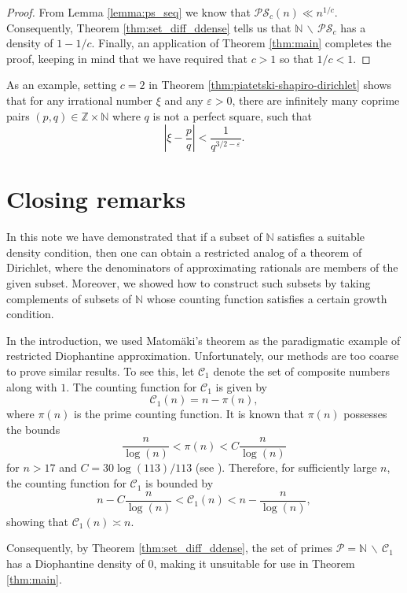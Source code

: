 \documentclass[reqno]{amsart}
\theoremstyle{definition}
\begin{document}
\begin{proof}
    From Lemma \ref{lemma:ps_seq} we know that $\mathcal{PS}_{c}(n) \ll n^{1/c}$.  Consequently, Theorem \ref{thm:set_diff_ddense} tells us that $\mathbb{N}\,\backslash\,\mathcal{PS}_{c}$ has a density of $1 - 1/c$.  Finally, an application of Theorem \ref{thm:main} completes the proof, keeping in mind that we have required that $c > 1$ so that $1/c < 1$.
\end{proof}
As an example, setting $c = 2$ in Theorem \ref{thm:piatetski-shapiro-dirichlet} shows that for any irrational number $\xi$ and any $\varepsilon > 0$, there are infinitely many coprime pairs $(p,q) \in \mathbb{Z} \times \mathbb{N}$ where $q$ is not a perfect square, such that
\begin{equation*}
    \left\vert{\xi- \frac{p}{q}}\right\vert < \frac{1}{q^{3/2-\varepsilon}}.
\end{equation*}

\section{Closing remarks}
In this note we have demonstrated that if a subset of $\mathbb{N}$ satisfies a suitable density condition, then one can obtain a restricted analog of a theorem of Dirichlet, where the denominators of approximating rationals are members of the given subset.  Moreover, we showed how to construct such subsets by taking complements of subsets of $\mathbb{N}$ whose counting function satisfies a certain growth condition.

In the introduction, we used Matom{\"a}ki's theorem as the paradigmatic example of restricted Diophantine approximation.  Unfortunately, our methods are too coarse to prove similar results.  To see this, let $\mathcal{C}_{1}$ denote the set of composite numbers along with $1$.  The counting function for $\mathcal{C}_{1}$ is given by
\begin{equation*}
    \mathcal{C}_{1}(n) = n - \pi(n), 
\end{equation*}
where $\pi(n)$ is the prime counting function.  It is known that $\pi(n)$ possesses the bounds
\begin{equation*}
    \frac{n}{\log(n)} < \pi(n) < C\frac{n}{\log(n)}
\end{equation*}
for $n > 17$ and $C = 30\log(113)/113$ (see \cite{barkley1962}).  Therefore, for sufficiently large $n$, the counting function for $\mathcal{C}_{1}$ is bounded by
\begin{equation*}
    n - C\frac{n}{\log(n)} <  \mathcal{C}_{1}(n) < n - \frac{n}{\log(n)},
\end{equation*}
showing that $\mathcal{C}_{1}(n) \asymp n$.

Consequently, by Theorem \ref{thm:set_diff_ddense}, the set of primes $\mathcal{P} = \mathbb{N} \,\backslash\, \mathcal{C}_{1}$ has a Diophantine density of $0$, making it unsuitable for use in Theorem \ref{thm:main}.
\end{document}
